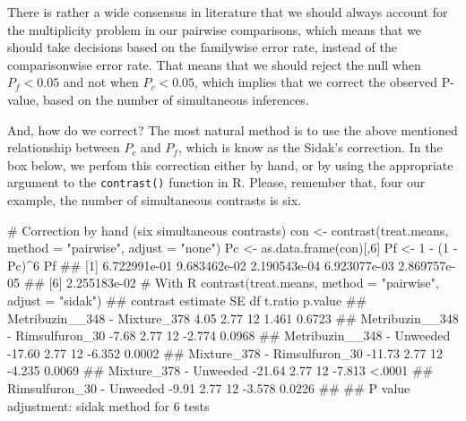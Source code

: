 \documentclass[a4paper,12pt,oneside]{book}
\newenvironment{Shaded}{\begin{snugshade}}{\end{snugshade}}
\newcommand{\DecValTok}[1]{#1}
\newcommand{\SpecialCharTok}[1]{#1}
\newcommand{\StringTok}[1]{#1}
\newcommand{\CommentTok}[1]{#1}
\newcommand{\DocumentationTok}[1]{#1}
\newcommand{\OtherTok}[1]{#1}
\newcommand{\FunctionTok}[1]{#1}
\newcommand{\AttributeTok}[1]{#1}
\newcommand{\NormalTok}[1]{#1}
\begin{document}
There is rather a wide consensus in literature that we should always account for the multiplicity problem in our pairwise comparisons, which means that we should take decisions based on the familywise error rate, instead of the comparisonwise error rate. That means that we should reject the null when \(P_f < 0.05\) and not when \(P_c < 0.05\), which implies that we correct the observed P-value, based on the number of simultaneous inferences.

And, how do we correct? The most natural method is to use the above mentioned relationship between \(P_c\) and \(P_f\), which is know as the Sidak's correction. In the box below, we perfom this correction either by hand, or by using the appropriate argument to the \texttt{contrast()} function in R. Please, remember that, four our example, the number of simultaneous contrasts is six.

\scriptsize

\begin{Shaded}
\begin{Highlighting}[]
\CommentTok{\# Correction by hand (six simultaneous contrasts)}
\NormalTok{con }\OtherTok{\textless{}{-}} \FunctionTok{contrast}\NormalTok{(treat.means, }\AttributeTok{method =} \StringTok{"pairwise"}\NormalTok{, }\AttributeTok{adjust =} \StringTok{"none"}\NormalTok{)}
\NormalTok{Pc }\OtherTok{\textless{}{-}} \FunctionTok{as.data.frame}\NormalTok{(con)[,}\DecValTok{6}\NormalTok{]}
\NormalTok{Pf }\OtherTok{\textless{}{-}} \DecValTok{1} \SpecialCharTok{{-}}\NormalTok{ (}\DecValTok{1} \SpecialCharTok{{-}}\NormalTok{ Pc)}\SpecialCharTok{\^{}}\DecValTok{6}
\NormalTok{Pf}
\DocumentationTok{\#\# [1] 6.722991e{-}01 9.683462e{-}02 2.190543e{-}04 6.923077e{-}03 2.869757e{-}05}
\DocumentationTok{\#\# [6] 2.255183e{-}02}
\CommentTok{\# With R}
\FunctionTok{contrast}\NormalTok{(treat.means, }\AttributeTok{method =} \StringTok{"pairwise"}\NormalTok{, }\AttributeTok{adjust =} \StringTok{"sidak"}\NormalTok{)}
\DocumentationTok{\#\#  contrast                         estimate   SE df t.ratio p.value}
\DocumentationTok{\#\#  Metribuzin\_\_348 {-} Mixture\_378        4.05 2.77 12   1.461  0.6723}
\DocumentationTok{\#\#  Metribuzin\_\_348 {-} Rimsulfuron\_30    {-}7.68 2.77 12  {-}2.774  0.0968}
\DocumentationTok{\#\#  Metribuzin\_\_348 {-} Unweeded         {-}17.60 2.77 12  {-}6.352  0.0002}
\DocumentationTok{\#\#  Mixture\_378 {-} Rimsulfuron\_30       {-}11.73 2.77 12  {-}4.235  0.0069}
\DocumentationTok{\#\#  Mixture\_378 {-} Unweeded             {-}21.64 2.77 12  {-}7.813  \textless{}.0001}
\DocumentationTok{\#\#  Rimsulfuron\_30 {-} Unweeded           {-}9.91 2.77 12  {-}3.578  0.0226}
\DocumentationTok{\#\# }
\DocumentationTok{\#\# P value adjustment: sidak method for 6 tests}
\end{Highlighting}
\end{Shaded}
\end{document}
